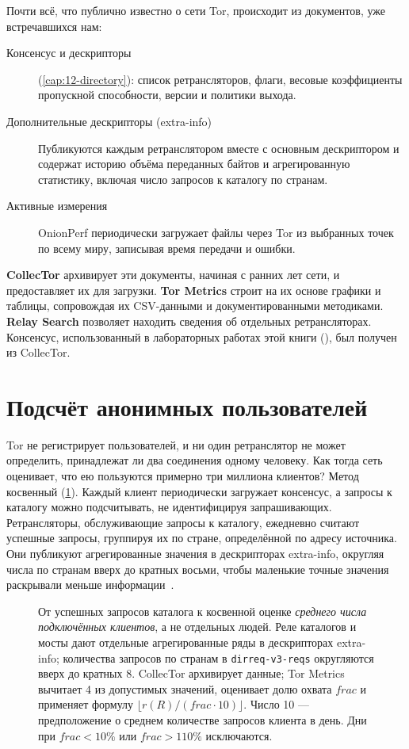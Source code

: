 Почти всё, что публично известно о сети Tor, происходит из документов, уже встречавшихся нам:
\begin{description}
  \item[Консенсус и дескрипторы] (\cref{cap:12-directory}): список ретрансляторов, флаги, весовые коэффициенты пропускной способности, версии и политики выхода.
  \item[Дополнительные дескрипторы (extra-info)] Публикуются каждым ретранслятором вместе с основным дескриптором и содержат историю объёма переданных байтов и агрегированную статистику, включая число запросов к каталогу по странам.
  \item[Активные измерения] OnionPerf периодически загружает файлы через Tor из выбранных точек по всему миру, записывая время передачи и ошибки.
\end{description}
\textbf{CollecTor} архивирует эти документы, начиная с ранних лет сети, и предоставляет их для загрузки. \textbf{Tor Metrics} строит на их основе графики и таблицы, сопровождая их CSV-данными и документированными методиками. \textbf{Relay Search} позволяет находить сведения об отдельных ретрансляторах. Консенсус, использованный в лабораторных работах этой книги (), был получен из CollecTor.

\section{Подсчёт анонимных пользователей}\label{sec:metrics-utenti}

Tor не регистрирует пользователей, и ни один ретранслятор не может определить, принадлежат ли два соединения одному человеку. Как тогда сеть оценивает, что ею пользуются примерно три миллиона клиентов? Метод косвенный (\cref{fig:stima}). Каждый клиент периодически загружает консенсус, а запросы к каталогу можно подсчитывать, не идентифицируя запрашивающих. Ретрансляторы, обслуживающие запросы к каталогу, ежедневно считают успешные запросы, группируя их по стране, определённой по адресу источника. Они публикуют агрегированные значения в дескрипторах extra-info, округляя числа по странам вверх до кратных восьми, чтобы маленькие точные значения раскрывали меньше информации~.

\begin{figure}[htbp]
\centering

\caption{От успешных запросов каталога к косвенной оценке \emph{среднего числа подключённых клиентов}, а не отдельных людей. Реле каталогов и мосты дают отдельные агрегированные ряды в дескрипторах extra-info; количества запросов по странам в \texttt{dirreq-v3-reqs} округляются вверх до кратных 8. CollecTor архивирует данные; Tor Metrics вычитает 4 из допустимых значений, оценивает долю охвата $\mathit{frac}$ и применяет формулу $\lfloor r(R)/(\mathit{frac}\cdot10)\rfloor$. Число 10 — предположение о среднем количестве запросов клиента в день. Дни при $\mathit{frac}<10\%$ или $\mathit{frac}>110\%$ исключаются.}
\label{fig:stima}
\end{figure}

